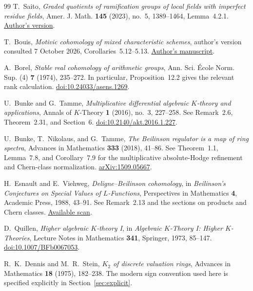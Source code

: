 \documentclass[11pt,a4paper]{article}
\theoremstyle{remark}
\begin{document}
\begin{thebibliography}{99}
T.~Saito, \emph{Graded quotients of ramification groups of local fields with imperfect residue fields}, Amer. J. Math. \textbf{145} (2023), no.~5, 1389--1464, Lemma~4.2.1.
\href{https://preprint.press.jhu.edu/ajm/sites/default/files/AJM-saito.pdf}{Author's version}.

T.~Bouis, \emph{Motivic cohomology of mixed characteristic schemes}, author's version consulted 7 October 2026, Corollaries~5.12--5.13.
\href{https://tessbouis.com/motivic_cohomology_schemes.pdf}{Author's manuscript}.

A.~Borel, \emph{Stable real cohomology of arithmetic groups}, Ann. Sci. \'Ecole Norm. Sup. (4) \textbf{7} (1974), 235--272. In particular, Proposition~12.2 gives the relevant rank calculation.
\href{https://doi.org/10.24033/asens.1269}{doi:10.24033/asens.1269}.

U.~Bunke and G.~Tamme, \emph{Multiplicative differential algebraic $K$-theory and applications}, Annals of $K$-Theory \textbf{1} (2016), no.~3, 227--258. See Remark~2.6, Theorem~2.31, and Section~6.
\href{https://doi.org/10.2140/akt.2016.1.227}{doi:10.2140/akt.2016.1.227}.

U.~Bunke, T.~Nikolaus, and G.~Tamme, \emph{The Beilinson regulator is a map of ring spectra}, Advances in Mathematics \textbf{333} (2018), 41--86. See Theorem~1.1, Lemma~7.8, and Corollary~7.9 for the multiplicative absolute-Hodge refinement and Chern-class normalization.
\href{https://arxiv.org/abs/1509.05667}{arXiv:1509.05667}.

H.~Esnault and E.~Viehweg, \emph{Deligne--Beilinson cohomology}, in \emph{Beilinson's Conjectures on Special Values of $L$-Functions}, Perspectives in Mathematics \textbf{4}, Academic Press, 1988, 43--91. See Remark~2.13 and the sections on products and Chern classes.
\href{https://ncatlab.org/nlab/files/EsnaultViehweg-DeligneBeilinsonCohomology.pdf}{Available scan}.

D.~Quillen, \emph{Higher algebraic $K$-theory I}, in \emph{Algebraic $K$-Theory I: Higher $K$-Theories}, Lecture Notes in Mathematics \textbf{341}, Springer, 1973, 85--147.
\href{https://doi.org/10.1007/BFb0067053}{doi:10.1007/BFb0067053}.

R.~K.~Dennis and M.~R.~Stein, \emph{$K_2$ of discrete valuation rings}, Advances in Mathematics \textbf{18} (1975), 182--238. The modern sign convention used here is specified explicitly in Section~\ref{sec:explicit}.


\end{thebibliography}
\end{document}
